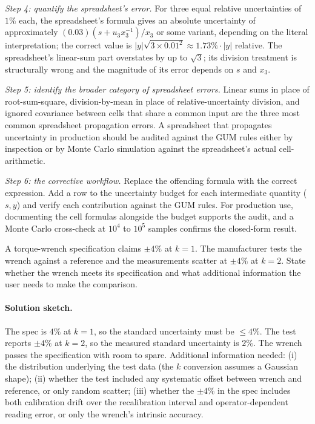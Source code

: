 \emph{Step 4: quantify the spreadsheet's error.} For three equal
relative uncertainties of $1\%$ each, the spreadsheet's formula
gives an absolute uncertainty of approximately $(0.03)(s + u_{3}
x_{3}^{-1})/x_{3}$ or some variant, depending on the literal
interpretation; the correct value is $|y|\sqrt{3 \times 0.01^{2}}
\approx 1.73\% \cdot |y|$ relative. The spreadsheet's
linear-sum part overstates by up to $\sqrt{3}$; its division
treatment is structurally wrong and the magnitude of its error
depends on $s$ and $x_{3}$.

\emph{Step 5: identify the broader category of spreadsheet
errors.} Linear sums in place of root-sum-square, division-by-mean
in place of relative-uncertainty division, and ignored covariance
between cells that share a common input are the three most common
spreadsheet propagation errors. A spreadsheet that propagates
uncertainty in production should be audited against the GUM rules
either by inspection or by Monte Carlo simulation against the
spreadsheet's actual cell-arithmetic.

\emph{Step 6: the corrective workflow.} Replace the offending
formula with the correct expression. Add a row to the uncertainty
budget for each intermediate quantity ($s, y$) and verify each
contribution against the GUM rules. For production use,
documenting the cell formulas alongside the budget supports the
audit, and a Monte Carlo cross-check at $10^{4}$ to $10^{5}$
samples confirms the closed-form result.

\begin{exercise}
A torque-wrench specification claims $\pm 4\%$ at $k = 1$. The
manufacturer tests the wrench against a reference and the
measurements scatter at $\pm 4\%$ at $k = 2$. State whether the
wrench meets its specification and what additional information
the user needs to make the comparison.
\end{exercise}

\paragraph{Solution sketch.}
The spec is $4\%$ at $k = 1$, so the standard uncertainty must be
$\leq 4\%$. The test reports $\pm 4\%$ at $k = 2$, so the
measured standard uncertainty is $2\%$. The wrench passes the
specification with room to spare. Additional information needed:
(i) the distribution underlying the test data (the $k$ conversion
assumes a Gaussian shape); (ii) whether the test included any
systematic offset between wrench and reference, or only random
scatter; (iii) whether the $\pm 4\%$ in the spec includes both
calibration drift over the recalibration interval and
operator-dependent reading error, or only the wrench's intrinsic
accuracy.

